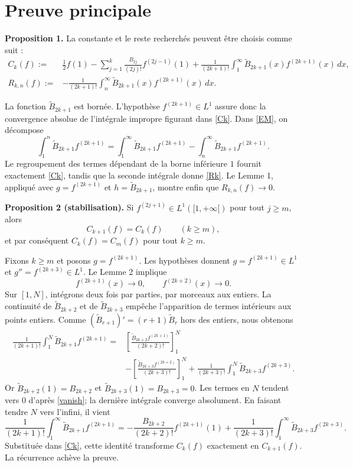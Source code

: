 \documentclass[11pt,a4paper]{article}
\newcommand{\Bper}[1]{\widetilde B_{#1}}
\begin{document}
\section{Preuve principale}

\begin{theorembox}
\textbf{Proposition 1.}
La constante et le reste recherch\'es peuvent \^etre choisis comme suit :
\begin{align}
C_k(f):={}&\frac12f(1)-\sum_{j=1}^{k}\frac{B_{2j}}{(2j)!}
 f^{(2j-1)}(1)
+\frac1{(2k+1)!}\int_1^\infty
 \Bper{2k+1}(x)f^{(2k+1)}(x)\,dx, \label{Ck}\tag{3}\\
R_{k,n}(f):={}&-\frac1{(2k+1)!}\int_n^\infty
 \Bper{2k+1}(x)f^{(2k+1)}(x)\,dx. \label{Rk}\tag{4}
\end{align}
\end{theorembox}
\begin{proofbox}
La fonction $\Bper{2k+1}$ est born\'ee. L'hypoth\`ese
$f^{(2k+1)}\in L^1$ assure donc la convergence absolue de l'int\'egrale
impropre figurant dans \eqref{Ck}. Dans \eqref{EM}, on d\'ecompose
\[
 \int_1^n \Bper{2k+1}f^{(2k+1)}
 =\int_1^\infty \Bper{2k+1}f^{(2k+1)}
 -\int_n^\infty \Bper{2k+1}f^{(2k+1)}.
\]
Le regroupement des termes d\'ependant de la borne inf\'erieure $1$ fournit
exactement \eqref{Ck}, tandis que la seconde int\'egrale donne \eqref{Rk}.
Le Lemme 1, appliqu\'e avec $g=f^{(2k+1)}$ et
$h=\Bper{2k+1}$, montre enfin que $R_{k,n}(f)\to0$.
\end{proofbox}

\begin{theorembox}
\textbf{Proposition 2 (stabilisation).}
Si $f^{(2j+1)}\in L^1([1,+\infty[)$ pour tout $j\geq m$, alors
\[
 C_{k+1}(f)=C_k(f)\qquad(k\geq m),
\]
et par cons\'equent $C_k(f)=C_m(f)$ pour tout $k\geq m$.
\end{theorembox}
\begin{proofbox}
Fixons $k\geq m$ et posons $g=f^{(2k+1)}$. Les hypoth\`eses donnent
$g=f^{(2k+1)}\in L^1$ et $g''=f^{(2k+3)}\in L^1$. Le Lemme 2 implique
\[
 f^{(2k+1)}(x)\to0,
 \qquad f^{(2k+2)}(x)\to0. \tag{5}\label{vanish}
\]
Sur $[1,N]$, int\'egrons deux fois par parties, par morceaux aux entiers. La
continuit\'e de $\Bper{2k+2}$ et de $\Bper{2k+3}$ emp\^eche l'apparition de
termes int\'erieurs aux points entiers. Comme
$(\Bper{r+1})'=(r+1)\Bper r$ hors des entiers, nous obtenons
\begin{align*}
\frac1{(2k+1)!}\int_1^N \Bper{2k+1}f^{(2k+1)}
={}&\left[\frac{\Bper{2k+2}f^{(2k+1)}}{(2k+2)!}\right]_1^N\\
&-\left[\frac{\Bper{2k+3}f^{(2k+2)}}{(2k+3)!}\right]_1^N
+\frac1{(2k+3)!}\int_1^N\Bper{2k+3}f^{(2k+3)}.
\end{align*}
Or $\Bper{2k+2}(1)=B_{2k+2}$ et
$\Bper{2k+3}(1)=B_{2k+3}=0$. Les termes en $N$ tendent vers $0$ d'apr\`es
\eqref{vanish}; la derni\`ere int\'egrale converge absolument. En faisant tendre
$N$ vers l'infini, il vient
\[
 \frac1{(2k+1)!}\int_1^\infty\Bper{2k+1}f^{(2k+1)}
 =-\frac{B_{2k+2}}{(2k+2)!}f^{(2k+1)}(1)
 +\frac1{(2k+3)!}\int_1^\infty\Bper{2k+3}f^{(2k+3)}.
\]
Substitu\'ee dans \eqref{Ck}, cette identit\'e transforme $C_k(f)$ exactement
en $C_{k+1}(f)$. La r\'ecurrence ach\`eve la preuve.
\end{proofbox}
\end{document}

